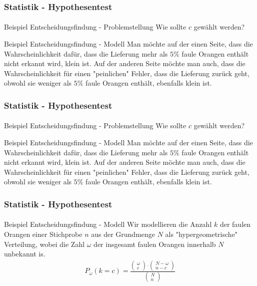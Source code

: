 \documentclass{beamer}
\begin{document}
\begin{frame}
    \frametitle{Statistik - Hypothesentest}
\framesubtitle{}
\begin{block}{Beispiel Entscheidungsfindung - Problemstellung}
Wie sollte $c$ gewählt werden?
\end{block}


\begin{block}{Beispiel Entscheidungsfindung - Modell}
Man möchte auf der einen Seite, dass die Wahrscheinlichkeit dafür, dass die Lieferung mehr als $5 \%$ faule Orangen enthält nicht erkannt wird, klein ist.
Auf der anderen Seite möchte man auch, dass die Wahrscheinlichkeit für einen  "peinlichen" Fehler, dass die Lieferung zurück geht, obwohl sie weniger als  $5 \%$ faule Orangen enthält, ebenfalls klein ist. 
\end{block}


 \end{frame}

\begin{frame}
    \frametitle{Statistik - Hypothesentest}
\framesubtitle{}
\begin{block}{Beispiel Entscheidungsfindung - Problemstellung}
Wie sollte $c$ gewählt werden?
\end{block}


\begin{block}{Beispiel Entscheidungsfindung - Modell}
Man möchte auf der einen Seite, dass die Wahrscheinlichkeit dafür, dass die Lieferung mehr als $5 \%$ faule Orangen enthält nicht erkannt wird, klein ist.
Auf der anderen Seite möchte man auch, dass die Wahrscheinlichkeit für einen  "peinlichen" Fehler, dass die Lieferung zurück geht, obwohl sie weniger als  $5 \%$ faule Orangen enthält, ebenfalls klein ist. 
\end{block}


 \end{frame}


\begin{frame}
    \frametitle{Statistik - Hypothesentest}
\framesubtitle{}
\begin{block}{Beispiel Entscheidungsfindung - Modell}
Wir modellieren die Anzahl $k$ der faulen Orangen einer Stichprobe $n$ aus der Grundmenge $N$ als "hypergeometrische" Verteilung, wobei die Zahl  $\omega$ der insgesamt faulen  Orangen innerhalb $N$ unbekannt is.
\begin{align*}
P_\omega (k= c)= \frac{\begin{pmatrix} \omega \\ c \end{pmatrix} \cdot  \begin{pmatrix} N - \omega \\ n - c \end{pmatrix}}{\begin{pmatrix} N \\ n \end{pmatrix} }
\end{align*} 
\end{block}


 \end{frame}
\end{document}
